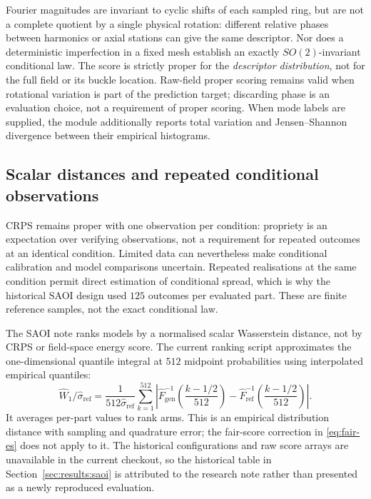 Fourier magnitudes are invariant to cyclic shifts of each sampled ring, but
are not a complete quotient by a single physical rotation: different
relative phases between harmonics or axial stations can give the same
descriptor. Nor does a deterministic imperfection in a fixed mesh establish
an exactly $SO(2)$-invariant conditional law. The score is strictly proper for
the \emph{descriptor distribution}, not for the full field or its buckle
location. Raw-field proper scoring remains valid when rotational variation
is part of the prediction target; discarding phase is an evaluation choice,
not a requirement of proper scoring. When mode labels are supplied, the
module additionally reports total variation and Jensen--Shannon divergence
between their empirical histograms.

\subsection{Scalar distances and repeated conditional observations}
\label{sec:protocol:crps-caveat}

CRPS remains proper with one observation per condition: propriety is an
expectation over verifying observations, not a requirement for repeated
outcomes at an identical condition. Limited data can nevertheless make
conditional calibration and model comparisons uncertain. Repeated
realisations at the same condition permit direct estimation of conditional
spread, which is why the historical SAOI design used $125$ outcomes per
evaluated part. These are finite reference samples, not the exact conditional
law.

The SAOI note ranks models by a normalised scalar Wasserstein distance,
not by CRPS or field-space energy score. The current ranking script
approximates the one-dimensional quantile integral at $512$ midpoint
probabilities using interpolated empirical quantiles:
\begin{equation}
 \widehat W_1/\widehat\sigma_{\mathrm{ref}}
 = \frac{1}{512\widehat\sigma_{\mathrm{ref}}}
   \sum_{k=1}^{512}\left|
    \widehat F_{\mathrm{gen}}^{-1}\!\left(\frac{k-1/2}{512}\right)
   -\widehat F_{\mathrm{ref}}^{-1}\!\left(\frac{k-1/2}{512}\right)\right|.
 \label{eq:saoi-w1}
\end{equation}
It averages per-part values to rank arms. This is an empirical distribution
distance with sampling and quadrature error; the fair-score correction in
\eqref{eq:fair-es} does not apply to it. The historical configurations and
raw score arrays are unavailable in the current checkout, so the historical
table in Section~\ref{sec:results:saoi} is attributed to the research note
rather than presented as a newly reproduced evaluation.
